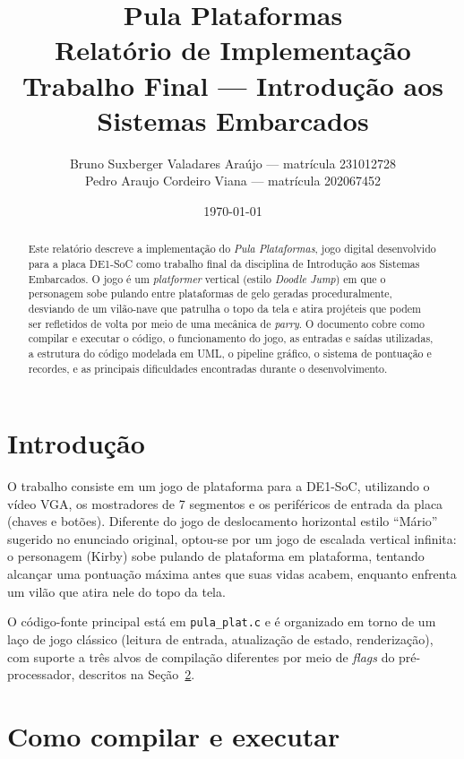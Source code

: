 \documentclass[a4paper,12pt]{article}
\title{\textbf{Pula Plataformas}\\[4pt]
\large Relatório de Implementação\\
Trabalho Final --- Introdução aos Sistemas Embarcados}
\author{Bruno Suxberger Valadares Araújo --- matrícula 231012728 \\
Pedro Araujo Cordeiro Viana --- matrícula 202067452}
\date{\today}
\newcommand{\code}[1]{\texttt{#1}}
\begin{document}
\maketitle

\begin{abstract}
Este relatório descreve a implementação do \emph{Pula Plataformas}, jogo digital
desenvolvido para a placa DE1-SoC como trabalho final da disciplina de
Introdução aos Sistemas Embarcados. O jogo é um \emph{platformer} vertical
(estilo \emph{Doodle Jump}) em que o personagem sobe pulando entre plataformas
de gelo geradas proceduralmente, desviando de um vilão-nave que patrulha o
topo da tela e atira projéteis que podem ser refletidos de volta por meio de
uma mecânica de \emph{parry}. O documento cobre como compilar e executar o
código, o funcionamento do jogo, as entradas e saídas utilizadas, a estrutura
do código modelada em UML, o pipeline gráfico, o sistema de pontuação e
recordes, e as principais dificuldades encontradas durante o desenvolvimento.
\end{abstract}

\tableofcontents

\section{Introdução}

O trabalho consiste em um jogo de plataforma para a DE1-SoC, utilizando o
vídeo VGA, os mostradores de 7 segmentos e os periféricos de entrada da placa
(chaves e botões). Diferente do jogo de deslocamento horizontal estilo
``Mário'' sugerido no enunciado original, optou-se por um jogo de escalada
vertical infinita: o personagem (Kirby) sobe pulando de plataforma em
plataforma, tentando alcançar uma pontuação máxima antes que suas vidas
acabem, enquanto enfrenta um vilão que atira nele do topo da tela.

O código-fonte principal está em \code{pula\_plat.c} e é organizado em torno de
um laço de jogo clássico (leitura de entrada, atualização de estado,
renderização), com suporte a três alvos de compilação diferentes por meio de
\emph{flags} do pré-processador, descritos na Seção~\ref{sec:compilar}.

\section{Como compilar e executar}
\label{sec:compilar}
\end{document}
